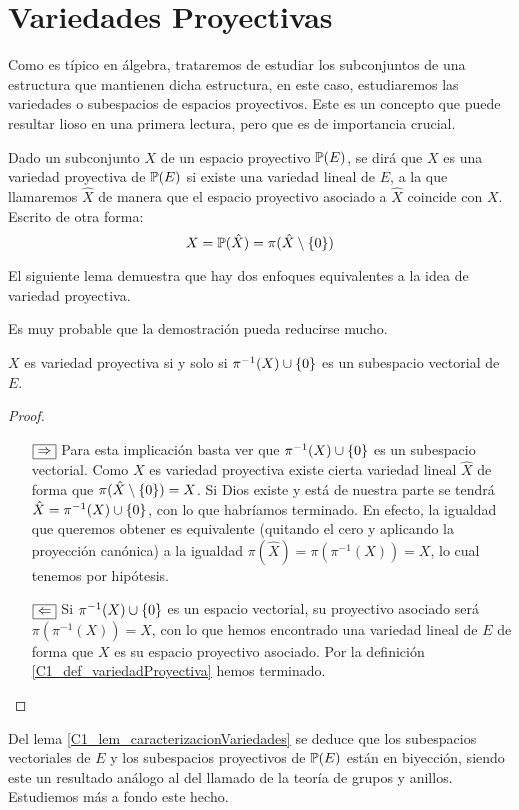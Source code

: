 \section{Variedades Proyectivas}
\label{C1_variedadesProyectivas}
Como es típico en álgebra, trataremos de estudiar los subconjuntos de una estructura que mantienen dicha estructura, en este caso, estudiaremos las variedades o subespacios de espacios proyectivos. Este es un concepto que puede resultar lioso en una primera lectura, pero que es de importancia crucial.
\begin{defi}
	\label{C1_def_variedadProyectiva}
	Dado un subconjunto $X$ de un espacio proyectivo $\mathbb{P}(E)$, se dirá que $X$ es una variedad proyectiva de $\mathbb{P}(E)$ si existe una variedad lineal de $E$, a la que llamaremos $\hat{X}$ de manera que el espacio proyectivo asociado a $\hat{X}$ coincide con $X$. Escrito de otra forma:
	\[
		X=\mathbb{P}(\hat{X})=\pi(\hat{X}\setminus\{0\})
	\]
\end{defi}

El siguiente lema demuestra que hay dos enfoques equivalentes a la idea de variedad proyectiva.

Es muy probable que la demostración pueda reducirse mucho.
\begin{lem}
	\label{C1_lem_caracterizacionVariedades}
	$X$ es variedad proyectiva si y solo si $\pi^{-1}(X)\cup\{0\}$ es un subespacio vectorial de $E$.
\end{lem}
\begin{proof}
\begin{itemize}
	\item[$\fbox{$\Rightarrow$}$] Para esta implicación basta ver que $\pi^{-1}(X)\cup\{0\}$ es un subespacio vectorial. Como $X$ es variedad proyectiva existe cierta variedad lineal $\hat{X}$ de forma que $\pi(\hat{X}\setminus\{0\})=X$. Si Dios existe y está de nuestra parte se tendrá  $\hat{X}=\pi^{-1}(X)\cup\{0\}$, con lo que habríamos terminado. En efecto, la igualdad que queremos obtener es equivalente (quitando el cero y aplicando la proyección canónica) a la igualdad $\pi(\hat{X})=\pi(\pi^{-1}(X))=X$, lo cual tenemos por hipótesis.
	\item[$\fbox{$\Leftarrow$}$] Si $\pi^{-1}(X)\cup\{0\}$ es un espacio vectorial, su proyectivo asociado será $\pi(\pi^{-1}(X))=X$, con lo que hemos encontrado una variedad lineal de $E$ de forma que $X$ es su espacio proyectivo asociado. Por la definición \ref{C1_def_variedadProyectiva} hemos terminado.
\end{itemize}
\end{proof}
Del lema \ref{C1_lem_caracterizacionVariedades} se deduce que los subespacios vectoriales de $E$ y los subespacios proyectivos de $\mathbb{P}(E)$ están en biyección, siendo este un resultado análogo al del llamado  de la teoría de grupos y anillos. Estudiemos más a fondo este hecho.

